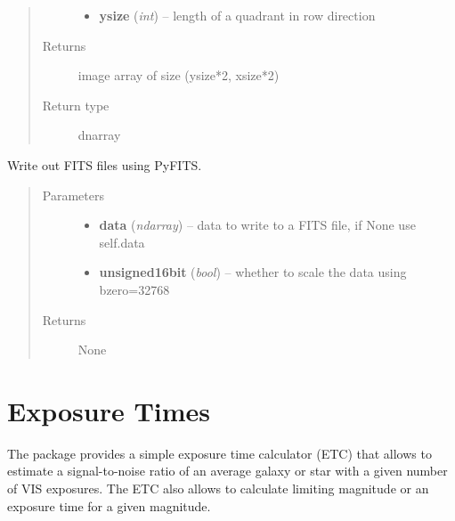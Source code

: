 \documentclass[a4paper,12pt,english]{sphinxmanual}
\begin{document}
\begin{fulllineitems}
\begin{fulllineitems}
\begin{quote}
\begin{description}
\begin{itemize}
\item {} 
\textbf{ysize} (\emph{int}) -- length of a quadrant in row direction

\end{itemize}

\item[{Returns}] \leavevmode
image array of size (ysize*2, xsize*2)

\item[{Return type}] \leavevmode
dnarray

\end{description}\end{quote}

\end{fulllineitems}


\begin{fulllineitems}
\label{postproc:postproc.tileCCD.tileCCD.writeFITSfile}
Write out FITS files using PyFITS.
\begin{quote}\begin{description}
\item[{Parameters}] \leavevmode\begin{itemize}
\item {} 
\textbf{data} (\emph{ndarray}) -- data to write to a FITS file, if None use self.data

\item {} 
\textbf{unsigned16bit} (\emph{bool}) -- whether to scale the data using bzero=32768

\end{itemize}

\item[{Returns}] \leavevmode
None

\end{description}\end{quote}

\end{fulllineitems}


\end{fulllineitems}



\chapter{Exposure Times}
\label{index:exposure-times}
The package provides a simple exposure time calculator (ETC) that allows to estimate a signal-to-noise ratio
of an average galaxy or star with a given number of VIS exposures. The ETC also allows to calculate limiting
magnitude or an exposure time for a given magnitude.
\end{document}
